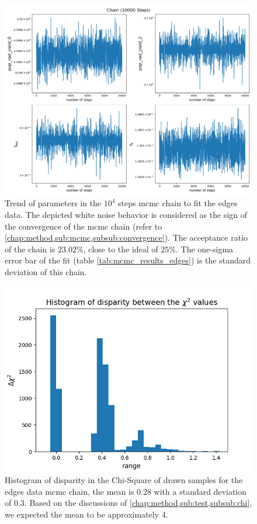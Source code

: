 \documentclass[12pt, TexShade, letterpaper]{report}
\begin{document}
\begin{figure}[h!]
\centering
\includegraphics[scale =0.5]{chain_edges.png}
\caption[Trend of parameters in the \gls{edges} data \gls{mcmc} chain]{Trend of parameters in the $10^4$ steps \gls{mcmc} chain to fit the \gls{edges} data. The depicted white noise behavior is considered as the sign of the convergence of the \gls{mcmc} chain (refer to \ref{chap:method,sub:mcmc,subsub:convergence}). The acceptance ratio of the chain is  $23.02\%$, close to the ideal of $25\%$. The one-sigma error bar of the fit (table \ref{tab:mcmc_results_edges}) is the standard deviation of this chain.} 
\label{fig:chain_edges}
\end{figure}

\begin{figure}[h!]
\centering
\includegraphics[scale =0.7]{csq_hist_edges.png}
\caption[Histogram of disparity in the Chi-Square of drawn samples for the \gls{EDGES} data \gls{mcmc} chain]{Histogram of disparity in the Chi-Square of drawn samples for the \gls{edges} data \gls{mcmc} chain, the mean is 0.28 with a standard deviation of 0.3. Based on the discussions of \ref{chap:method,sub:test,subsub:chi}, we expected the mean to be approximately 4.}
\label{fig:csq_hist_edges}
\end{figure}
\end{document}
